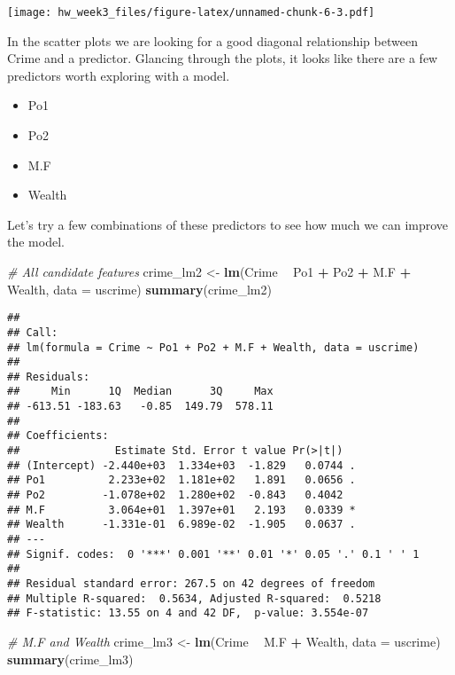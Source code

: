 \documentclass[]{article}
\newenvironment{Shaded}{\begin{snugshade}}{\end{snugshade}}
\newcommand{\KeywordTok}[1]{\textcolor[rgb]{0.13,0.29,0.53}{\textbf{#1}}}
\newcommand{\DataTypeTok}[1]{\textcolor[rgb]{0.13,0.29,0.53}{#1}}
\newcommand{\StringTok}[1]{\textcolor[rgb]{0.31,0.60,0.02}{#1}}
\newcommand{\CommentTok}[1]{\textcolor[rgb]{0.56,0.35,0.01}{\textit{#1}}}
\newcommand{\OperatorTok}[1]{\textcolor[rgb]{0.81,0.36,0.00}{\textbf{#1}}}
\newcommand{\NormalTok}[1]{#1}
\providecommand{\tightlist}{%
  \setlength{\itemsep}{0pt}\setlength{\parskip}{0pt}}
\begin{document}
\texttt{[image: hw\_week3\_files/figure-latex/unnamed-chunk-6-3.pdf]}

In the scatter plots we are looking for a good diagonal relationship
between Crime and a predictor. Glancing through the plots, it looks like
there are a few predictors worth exploring with a model.

\begin{itemize}
\tightlist
\item
  Po1
\item
  Po2
\item
  M.F
\item
  Wealth
\end{itemize}

Let's try a few combinations of these predictors to see how much we can
improve the model.

\begin{Shaded}
\begin{Highlighting}[]
\CommentTok{# All candidate features}
\NormalTok{crime_lm2 <-}\StringTok{ }\KeywordTok{lm}\NormalTok{(Crime }\OperatorTok{~}\StringTok{ }\NormalTok{Po1 }\OperatorTok{+}\StringTok{ }\NormalTok{Po2 }\OperatorTok{+}\StringTok{ }\NormalTok{M.F }\OperatorTok{+}\StringTok{ }\NormalTok{Wealth, }\DataTypeTok{data =}\NormalTok{ uscrime)}
\KeywordTok{summary}\NormalTok{(crime_lm2)}
\end{Highlighting}
\end{Shaded}

\begin{verbatim}
## 
## Call:
## lm(formula = Crime ~ Po1 + Po2 + M.F + Wealth, data = uscrime)
## 
## Residuals:
##     Min      1Q  Median      3Q     Max 
## -613.51 -183.63   -0.85  149.79  578.11 
## 
## Coefficients:
##               Estimate Std. Error t value Pr(>|t|)  
## (Intercept) -2.440e+03  1.334e+03  -1.829   0.0744 .
## Po1          2.233e+02  1.181e+02   1.891   0.0656 .
## Po2         -1.078e+02  1.280e+02  -0.843   0.4042  
## M.F          3.064e+01  1.397e+01   2.193   0.0339 *
## Wealth      -1.331e-01  6.989e-02  -1.905   0.0637 .
## ---
## Signif. codes:  0 '***' 0.001 '**' 0.01 '*' 0.05 '.' 0.1 ' ' 1
## 
## Residual standard error: 267.5 on 42 degrees of freedom
## Multiple R-squared:  0.5634, Adjusted R-squared:  0.5218 
## F-statistic: 13.55 on 4 and 42 DF,  p-value: 3.554e-07
\end{verbatim}

\begin{Shaded}
\begin{Highlighting}[]
\CommentTok{# M.F and Wealth}
\NormalTok{crime_lm3 <-}\StringTok{ }\KeywordTok{lm}\NormalTok{(Crime }\OperatorTok{~}\StringTok{ }\NormalTok{M.F }\OperatorTok{+}\StringTok{ }\NormalTok{Wealth, }\DataTypeTok{data =}\NormalTok{ uscrime)}
\KeywordTok{summary}\NormalTok{(crime_lm3)}
\end{Highlighting}
\end{Shaded}
\end{document}
